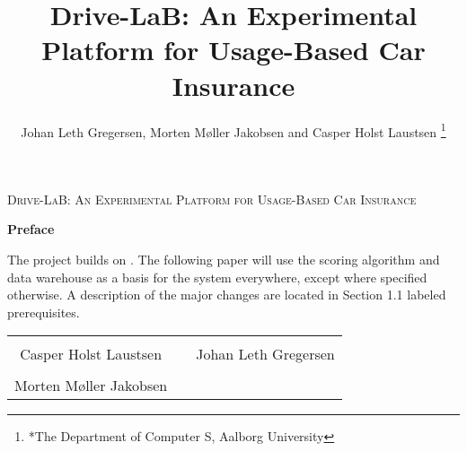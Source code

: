 \documentclass[a4paper, 10pt, conference]{ieeeconf}      %
\title{\LARGE \bf
Drive-LaB: An Experimental Platform for Usage-Based Car Insurance
}
\author{Johan Leth Gregersen, Morten Møller Jakobsen and Casper Holst Laustsen%
\thanks{*The Department of Computer S, Aalborg University}%
}
\begin{document}
\begin{titlepage}
	\centering
	{\scshape\LARGE Drive-LaB: An Experimental Platform for Usage-Based Car Insurance\par}
	\vspace{0.5cm}
	{\huge\bfseries Preface\par}
	\vspace{0.5cm}
	The project builds on \citep{sw9_report}. The following paper will use the scoring algorithm and data warehouse as a basis for the system everywhere, except where specified otherwise. A description of the major changes are located in Section 1.1 labeled prerequisites. 

\begin{table} [h]
	\centering
	\vspace{2cm}
		\begin{tabular}{c c c}
			\rowcolors{0}{}{}
			\underline{\phantom{JAERJAERJAERJAERGO}} & \phantom{cookies} & \underline{\phantom{JAERJAERJAERJAERGO}} \\
			Casper Holst Laustsen & \phantom{cookies} & Johan Leth Gregersen\\[1.5cm]
		    \rowcolor{white}\underline{\phantom{JAERJAERJAERJAERGO}} &\phantom{cookies} & {\phantom{JAERJAERJAERJAERGO}} \\
			Morten Møller Jakobsen & \phantom{cookies} & \\[1.5cm]				
		\end{tabular}
\end{table}

\end{titlepage}

\maketitle
\thispagestyle{empty}
\pagestyle{empty}

























\end{document}
